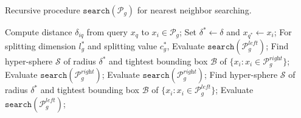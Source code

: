 \documentclass{article}
\begin{document}
\begin{algorithm}[!htb]
  \caption{Recursive procedure $\mathtt{search}(\mathcal{P}_g)$ for nearest neighbor searching.}
  \label{alg:searchkdtree}
  \begin{algorithmic}[1]
  \STATE Compute distance $\delta_{iq}$ from query $x_q$ to $x_i\in\mathcal{P}_g$;
  \STATE Set $\delta^*\leftarrow\delta$ and $x_{q^*}\leftarrow x_{i}$;
  \ENDIF
  \RETURN
  \ELSE
  \STATE For splitting dimension $l_g^*$ and splitting value $c_g^*$,
  \STATE Evaluate $\mathtt{search}(\mathcal{P}^{\textit{left}}_g)$;
  \STATE Find hyper-sphere $\mathcal{S}$ of radius $\delta^*$ and tightest bounding box $\mathcal{B}$ of $\{x_i:x_i\in\mathcal{P}^{\textit{right}}_g\}$;
  \STATE Evaluate $\mathtt{search}(\mathcal{P}^{\textit{right}}_g)$;
  \ENDIF
  \RETURN
  \ELSE
  \STATE Evaluate $\mathtt{search}(\mathcal{P}^{\textit{right}}_g)$;
  \STATE Find hyper-sphere $\mathcal{S}$ of radius $\delta^*$ and tightest bounding box $\mathcal{B}$ of $\{x_i:x_i\in\mathcal{P}^{\textit{left}}_g\}$;
  \STATE Evaluate $\mathtt{search}(\mathcal{P}^{\textit{left}}_g)$;
  \ENDIF
  \RETURN
  \ENDIF
  \ENDIF
  \end{algorithmic}
\end{algorithm}
\end{document}
